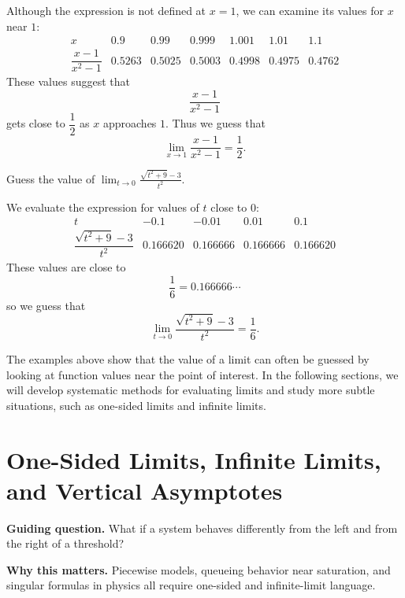 \begin{solution}
Although the expression is not defined at \(x=1\), we can examine its values for \(x\) near \(1\):
\[
\begin{array}{c|cccccc}
x & 0.9 & 0.99 & 0.999 & 1.001 & 1.01 & 1.1 \\ \hline
\dfrac{x-1}{x^{2}-1} & 0.5263 & 0.5025 & 0.5003 & 0.4998 & 0.4975 & 0.4762
\end{array}
\]
These values suggest that
\[
\frac{x-1}{x^{2}-1}
\]
gets close to \(\dfrac{1}{2}\) as \(x\) approaches \(1\). Thus we guess that
\[
\lim_{x\to 1}\frac{x-1}{x^{2}-1}=\frac{1}{2}.
\]
\end{solution}

\begin{example}
Guess the value of
\(\displaystyle
\lim_{t\to 0}\frac{\sqrt{t^{2}+9}-3}{t^{2}}.
\)
\end{example}

\begin{solution}
We evaluate the expression for values of \(t\) close to \(0\):
\[
\begin{array}{c|cccc}
t & -0.1 & -0.01 & 0.01 & 0.1 \\ \hline
\dfrac{\sqrt{t^{2}+9}-3}{t^{2}} & 0.166620 & 0.166666 & 0.166666 & 0.166620
\end{array}
\]
These values are close to
\[
\frac{1}{6}=0.166666\cdots
\]
so we guess that
\[
\lim_{t\to 0}\frac{\sqrt{t^{2}+9}-3}{t^{2}}=\frac{1}{6}.
\]
\end{solution}

The examples above show that the value of a limit can often be guessed by looking at function values near the point of interest. In the following sections, we will develop systematic methods for evaluating limits and study more subtle situations, such as one-sided limits and infinite limits.

\section{One-Sided Limits, Infinite Limits, and Vertical Asymptotes}

\begin{remark}
\textbf{Guiding question.} What if a system behaves differently from the left and from the right of a threshold?

\textbf{Why this matters.} Piecewise models, queueing behavior near saturation, and singular formulas in physics all require one-sided and infinite-limit language.
\end{remark}

